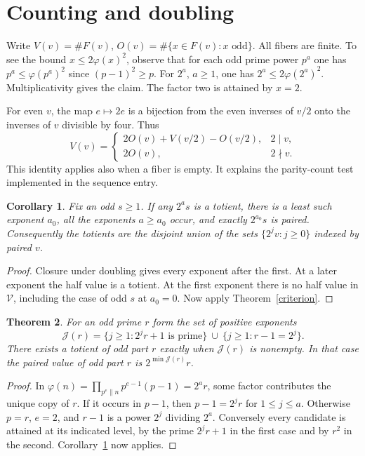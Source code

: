 \documentclass[11pt]{article}
\newtheorem{theorem}{Theorem}[section]
\newtheorem{corollary}[theorem]{Corollary}
\newcommand{\ph}{\varphi}
\newcommand{\V}{\mathcal V}
\begin{document}
\clearpage
\section{Counting and doubling}
Write $V(v)=\#F(v)$, $O(v)=\#\{x\in F(v):x\text{ odd}\}$. All fibers are finite. To see the bound $x\le2\ph(x)^2$, observe that for each odd prime power $p^a$ one has $p^a\le\ph(p^a)^2$ since $(p-1)^2\ge p$. For $2^a$, $a\ge1$, one has $2^a\le2\ph(2^a)^2$. Multiplicativity gives the claim. The factor two is attained by $x=2$.

For even $v$, the map $e\mapsto2e$ is a bijection from the even inverses of $v/2$ onto the inverses of $v$ divisible by four. Thus
\[
 V(v)=\begin{cases}
 2O(v)+V(v/2)-O(v/2),&2\mid v,\\
 2O(v),&2\nmid v .
 \end{cases}
\]
This identity applies also when a fiber is empty. It explains the parity-count test implemented in the sequence entry.
\begin{corollary}\label{ray}
Fix an odd $s\ge1$. If any $2^as$ is a totient, there is a least such exponent $a_0$, all the exponents $a\ge a_0$ occur, and exactly $2^{a_0}s$ is paired. Consequently the totients are the disjoint union of the sets $\{2^jv:j\ge0\}$ indexed by paired $v$.
\end{corollary}
\begin{proof}
Closure under doubling gives every exponent after the first. At a later exponent the half value is a totient. At the first exponent there is no half value in $\V$, including the case of odd $s$ at $a_0=0$. Now apply Theorem~\ref{criterion}.
\end{proof}

\begin{theorem}\label{primecore}
For an odd prime $r$ form the set of positive exponents
\[
 \mathcal J(r)=\{j\ge1:2^j r+1\text{ is prime}\}
 \ \cup\ \{j\ge1:r-1=2^j\}.
\]
There exists a totient of odd part $r$ exactly when $\mathcal J(r)$ is nonempty. In that case the paired value of odd part $r$ is $2^{\min\mathcal J(r)}r$.
\end{theorem}
\begin{proof}
In $\ph(n)=\prod_{p^e\parallel n}p^{e-1}(p-1)=2^a r$, some factor contributes the unique copy of $r$. If it occurs in $p-1$, then $p-1=2^j r$ for $1\le j\le a$. Otherwise $p=r$, $e=2$, and $r-1$ is a power $2^j$ dividing $2^a$. Conversely every candidate is attained at its indicated level, by the prime $2^j r+1$ in the first case and by $r^2$ in the second. Corollary~\ref{ray} now applies.
\end{proof}
\end{document}

